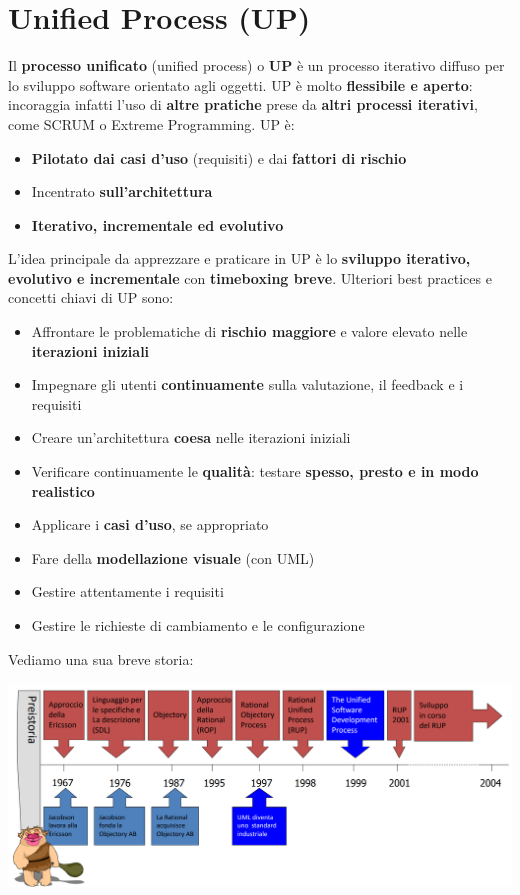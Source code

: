 \documentclass[12pt]{article}
\begin{document}
\section{Unified Process (UP)}
Il \textbf{processo unificato} (unified process) o \textbf{UP} è un processo iterativo diffuso per lo sviluppo software orientato agli oggetti.
UP è molto \textbf{flessibile e aperto}: incoraggia infatti l'uso di \textbf{altre pratiche} prese da \textbf{altri processi iterativi}, come SCRUM o Extreme Programming.
UP è:
\begin{itemize}
    \item \textbf{Pilotato dai casi d'uso} (requisiti) e dai \textbf{fattori di rischio}
    \item Incentrato \textbf{sull'architettura}
    \item \textbf{Iterativo, incrementale ed evolutivo}
\end{itemize}
L'idea principale da apprezzare e praticare in UP è lo \textbf{sviluppo iterativo, evolutivo e incrementale} con \textbf{timeboxing breve}. Ulteriori best practices e concetti chiavi di UP sono:
\begin{itemize}
    \item Affrontare le problematiche di \textbf{rischio maggiore} e valore elevato nelle \textbf{iterazioni iniziali}
    \item Impegnare gli utenti \textbf{continuamente} sulla valutazione, il feedback e i requisiti
    \item Creare un'architettura \textbf{coesa} nelle iterazioni iniziali
    \item Verificare continuamente le \textbf{qualità}: testare \textbf{spesso, presto e in modo realistico}
    \item Applicare i \textbf{casi d'uso}, se appropriato
    \item Fare della \textbf{modellazione visuale} (con UML)
    \item Gestire attentamente i requisiti
    \item Gestire le richieste di cambiamento e le configurazione
\end{itemize}
Vediamo una sua breve storia:
\begin{center}
    \includegraphics[width = 1\textwidth]{Images/18.png}
\end{center}
\end{document}
